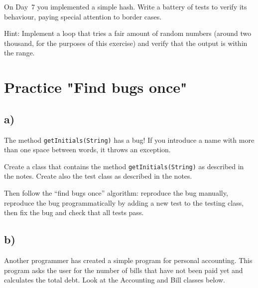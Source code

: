 \documentclass{article}
\begin{document}
On Day~7 you implemented a simple hash. Write a battery of tests to
verify its behaviour, paying special attention to border cases. 

Hint: Implement a loop that tries a fair amount of random numbers
(around two thousand, for the purposes of this exercise) and verify
that the output is within the range. 


\section{Practice "Find bugs once"}
\label{sec:practice-find-bugs}

\subsection*{a)}

The method \verb+getInitials(String)+ has a bug! If you introduce a
name with more than one space between words, it throws an exception.

Create a class that contains the method \verb+getInitials(String)+ as
described in the notes. Create also the test class as described in the
notes. 

Then follow the ``find bugs once'' algorithm: reproduce the bug manually,
reproduce the bug programmatically by adding a new test to the testing
class, then fix the bug and check that all tests pass. 

\subsection*{b)}
\label{sec:b}

Another programmer has created a simple program for personal
accounting. This program asks the user for the number of bills that have not
been paid yet and calculates the total debt. Look at the Accounting
and Bill classes below. 
\end{document}
